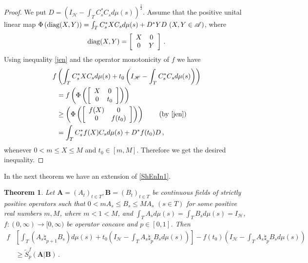 \documentclass[12pt, reqno]{amsart}
\newtheorem{theorem}{Theorem}[section]
\theoremstyle{definition}
\theoremstyle{remark}
\numberwithin{equation}{section}
\begin{document}
\begin{proof}
We put $D=(I_{\mathscr H}-\int_TC_s^*C_sd\mu(s))^\frac{1}{2}$. Assume that the positive unital linear map $\Phi\left({\rm diag}(X,Y)\right)=\int_TC_s^*XC_sd\mu(s)+D^*YD\,\,(X,Y\in\mathscr{A})$, where
$${\rm diag}(X,Y)=\left[\begin{array}{cc}
                         X &  0\\0 & Y
 \end{array}\right]\,.
$$
Using inequality \eqref{jen} and the operator monotonicity of $f$ we have
\begin{align*}
f&\left(\int_TC_s^*XC_sd\mu(s)+t_0\left(I_{\mathscr H}-\int_TC_s^*C_sd\mu(s)\right)\right)\\
&=f\left(\Phi\left(\left[\begin{array}{cc}
                         X &  0\\0 & t_0
 \end{array}\right]\right)\right)\\
 &\geq\left(\Phi\left(\left[\begin{array}{cc}
         f(X) &  0\\0 & f(t_0)
 \end{array}\right]\right)\right)\,\qquad(\textrm{by \eqref{jen}})\\
 &=\int_TC_s^*f(X)C_sd\mu(s)+D^*f(t_0)D\,,
\end{align*}
whenever $0<m\leq X \leq M$ and $t_0\in[m,M]$. Therefore we get the desired inequality.
\end{proof}
In the next theorem we have an extension of \eqref{ShEnIn1}.
\begin{theorem}\label{tShEnIn000}
Let $\mathbf{A}=(A_t)_{t\in T},\mathbf{B}=(B_t)_{t\in T}$ be continuous fields of strictly positive operators such that $0<m A_s \leq B_s \leq M A_s\,\,(s\in T)$  for some positive real numbers $m, M$, where $m<1<M$, and $\int_TA_sd\mu(s)=\int_TB_sd\mu(s)=I_{\mathscr H}$, $f: (0,\infty) \to [0,\infty)$ be operator concave and $p\in[0,1]$. Then
{\footnotesize
\begin{align}\label{ShEnIn}
f&\left[\int_T(A_s\natural_{p+1}B_s)d\mu(s)+t_0\left(I_{\mathscr H}-\int_TA_s\natural_pB_sd\mu(s)\right)\right]-f(t_0)\left(I_{\mathscr H}-\int_TA_s\natural_pB_sd\mu(s)\right)\nonumber\\
&\ge \widetilde{S}_p^f(\mathbf{A}|\mathbf{B})\,.
\end{align}}
\end{theorem}
\end{document}
